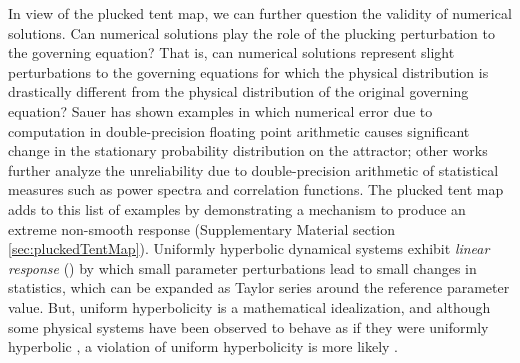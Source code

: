In view of the plucked tent map, we can further question the
validity of numerical solutions. Can numerical solutions play 
the role of the plucking perturbation to the 
governing equation? That is, can numerical solutions represent 
slight perturbations to the governing equations for which the physical 
distribution is drastically different from the physical distribution 
of the original governing equation? Sauer \cite{sauer} has shown 
examples in which numerical error due to computation in double-precision floating point arithmetic causes significant change in the stationary probability distribution on the attractor; other works \cite{cns} further analyze the unreliability due to double-precision arithmetic of statistical measures such as power spectra and correlation functions. The plucked tent map adds to this list of examples by demonstrating a mechanism to produce an extreme non-smooth response (Supplementary Material section \ref{sec:pluckedTentMap}). Uniformly hyperbolic 
dynamical systems exhibit \emph{linear response} 
(\cite{ruelle}\cite{baladi}) by which small parameter perturbations 
lead to small changes in statistics, which can be expanded as Taylor series around the reference parameter value. But, uniform hyperbolicity is a mathematical idealization, and although some physical systems have been observed to behave as if they were uniformly hyperbolic \cite{gallavotti}, a violation of uniform hyperbolicity is more likely 
\cite{wormell}\cite{luca}. 

